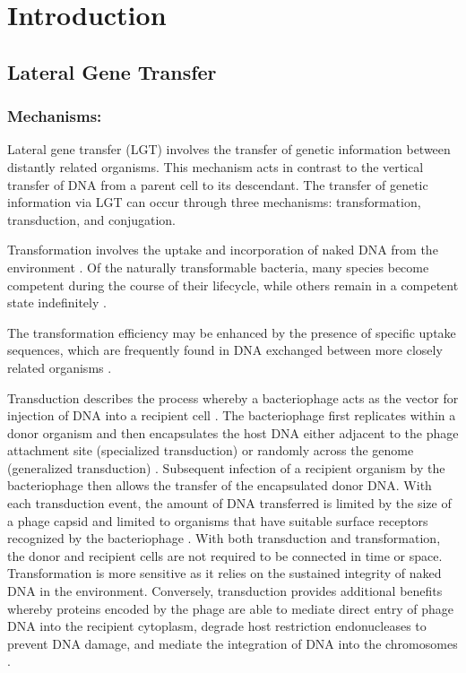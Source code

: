 \documentclass[english]{article}
\begin{document}
\section{Introduction}
\thefontsize\large
\onehalfspacing
\subsection{Lateral Gene Transfer}

\subsubsection{Mechanisms:}
Lateral gene transfer (LGT) involves the transfer of genetic information
between distantly related organisms. This mechanism acts in contrast to
the vertical transfer of DNA from a parent cell to its descendant. The
transfer of genetic information via LGT can occur through three
mechanisms: transformation, transduction, and conjugation.

Transformation involves the uptake and incorporation of naked DNA from
the environment \citep{Ochm:00}. Of the naturally transformable bacteria, many species
become competent during the course of their lifecycle, while others
remain in a competent state indefinitely \citep{Ochm:00}.

The transformation
efficiency may be enhanced by the presence of specific uptake
sequences, which are frequently found in DNA exchanged between more
closely related organisms \citep{Ochm:00}. 

Transduction describes the process whereby a bacteriophage acts as the
vector for injection of DNA into a recipient cell \citep{Raga:09}. The bacteriophage
first replicates within a donor organism and then encapsulates the
host DNA either adjacent to the phage attachment site (specialized
transduction) or randomly across the genome (generalized
transduction) \citep{Raga:09}. Subsequent infection of a recipient organism by the
bacteriophage then allows the transfer of the
encapsulated donor DNA. With each transduction event, the amount of
DNA transferred is limited by the size of a phage capsid and limited
to organisms that have suitable surface receptors recognized by the
bacteriophage \citep{Raga:09}. With both transduction and transformation,
the donor and recipient cells are not required to be connected in time
or space. Transformation is more sensitive as it relies on the
sustained integrity of naked DNA in the environment. Conversely,
transduction provides additional benefits whereby proteins encoded by
the phage are able to mediate direct entry of phage DNA into the
recipient cytoplasm, degrade host restriction endonucleases to prevent
DNA damage, and mediate the integration of DNA into the chromosomes
\citep{Ochm:00}. 
\end{document}
